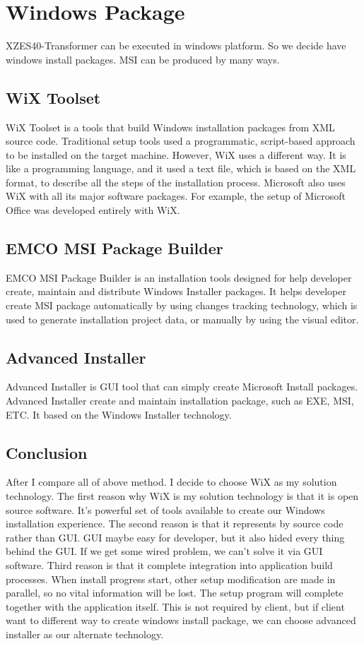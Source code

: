 \section{Windows Package}
XZES40-Transformer can be executed in windows platform. So we decide have windows install packages. MSI can be produced by many ways.

\subsection{WiX Toolset}
WiX Toolset is a tools that build Windows installation packages from XML source code. Traditional setup tools used a programmatic, script-based approach to be installed on the target machine. However, WiX uses a different way. It is like a programming language, and it used a text file, which is based on the XML format, to describe all the steps of the installation process. Microsoft also uses WiX with all its major software packages. For example, the setup of Microsoft Office was developed entirely with WiX. \cite{Wix_tool}

\subsection{EMCO MSI Package Builder}
EMCO MSI Package Builder is an installation tools designed for help developer create, maintain and distribute Windows Installer packages. \cite{EMCO_MSI} It helps developer create MSI package automatically by using changes tracking technology, which is used to generate installation project data, or manually by using the visual editor.

\subsection{Advanced Installer}
Advanced Installer is GUI tool that can simply create Microsoft Install packages. Advanced Installer create and maintain installation package, such as EXE, MSI, ETC. It based on the Windows Installer technology. \cite{advanced_install}

\subsection{Conclusion}
After I compare all of above method. I decide to choose WiX as my solution technology. The first reason why WiX is my solution technology is that it is open source software. It's powerful set of tools available to create our Windows installation experience.
The second reason is that it represents by source code rather than GUI. GUI maybe easy for developer, but it also hided every thing behind the GUI. If we get some wired problem, we can't solve it via GUI software. Third reason is that it complete integration into application build processes. When install progress start, other setup modification are made in parallel, so no vital information will be lost. The setup program will complete together with the application itself. This is not required by client, but if client want to different way to create windows install package, we can choose advanced installer as our alternate technology.
